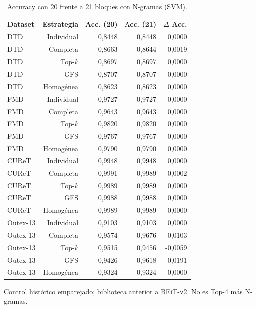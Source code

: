 \begin{table}[!htbp]\centering
\fontsize{8}{10}\selectfont\setlength{\tabcolsep}{4pt}
\caption{Accuracy con 20 frente a 21 bloques con N-gramas (SVM).}\label{tab:ngram-accuracy-svm}
\begin{tabular}{@{}lrrrr@{}}\toprule
Dataset & Estrategia & Acc. (20) & Acc. (21) & $\Delta$ Acc.\\\midrule
DTD & Individual & 0,8448 & 0,8448 & 0,0000\\
DTD & Completa & 0,8663 & 0,8644 & -0,0019\\
DTD & Top-$k$ & 0,8697 & 0,8697 & 0,0000\\
DTD & GFS & 0,8707 & 0,8707 & 0,0000\\
DTD & Homogénea & 0,8623 & 0,8623 & 0,0000\\
FMD & Individual & 0,9727 & 0,9727 & 0,0000\\
FMD & Completa & 0,9643 & 0,9643 & 0,0000\\
FMD & Top-$k$ & 0,9820 & 0,9820 & 0,0000\\
FMD & GFS & 0,9767 & 0,9767 & 0,0000\\
FMD & Homogénea & 0,9790 & 0,9790 & 0,0000\\
CUReT & Individual & 0,9948 & 0,9948 & 0,0000\\
CUReT & Completa & 0,9991 & 0,9989 & -0,0002\\
CUReT & Top-$k$ & 0,9989 & 0,9989 & 0,0000\\
CUReT & GFS & 0,9988 & 0,9988 & 0,0000\\
CUReT & Homogénea & 0,9989 & 0,9989 & 0,0000\\
Outex-13 & Individual & 0,9103 & 0,9103 & 0,0000\\
Outex-13 & Completa & 0,9574 & 0,9676 & 0,0103\\
Outex-13 & Top-$k$ & 0,9515 & 0,9456 & -0,0059\\
Outex-13 & GFS & 0,9426 & 0,9618 & 0,0191\\
Outex-13 & Homogénea & 0,9324 & 0,9324 & 0,0000\\
\bottomrule\end{tabular}
\par\smallskip\begin{minipage}{0.98\textwidth}\footnotesize Control histórico emparejado; biblioteca anterior a BEiT-v2. No es Top-4 más N-gramas.\end{minipage}
\end{table}

